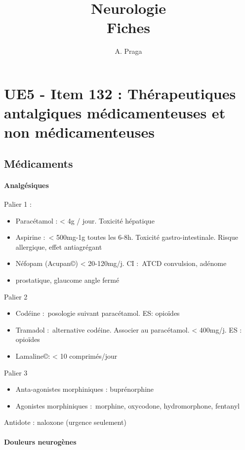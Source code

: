 \documentclass{article}
\title{Neurologie\\
\large Fiches}
\author{A. Praga}
\begin{document}
\maketitle

\section{UE5 - Item 132 : Thérapeutiques antalgiques médicamenteuses et non
médicamenteuses}%
\label{sec:ue5_item_132}

\subsection{Médicaments}%

\paragraph{Analgésiques}%

Palier 1 :
\begin{itemize}
  \item Paracétamol : < 4g / jour. Toxicité hépatique
  \item Aspirine : < 500mg-1g toutes les 6-8h. Toxicité gastro-intestinale. Risque allergique, effet antiagrégant
  \item Néfopam (Acupan\copyright) < 20-120mg/j. CI : ATCD convulsion, adénome
  \item prostatique, glaucome angle fermé
\end{itemize}

Palier 2

\begin{itemize}
\item Codéine : posologie suivant paracétamol. ES: opioïdes
\item Tramadol : alternative codéine. Associer au paracétamol. < 400mg/j. ES : opioïdes
\item Lamaline\copyright : < 10 comprimés/jour
\end{itemize}

Palier 3
\begin{itemize}
  \item Anta-agonistes morphiniques : buprénorphine
  \item Agonistes morphiniques : morphine, oxycodone, hydromorphone, fentanyl
\end{itemize}

Antidote : naloxone (urgence seulement)

\paragraph{Douleurs neurogènes}%
\end{document}
